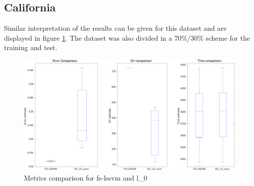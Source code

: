 \documentclass[11pt, a4paper]{article}
\begin{document}
\subsection{California}

Similar interpretation of the results can be given for this dataset
and are displayed in figure \ref{fig:fslssvm_california}. The dataset
was also divided in a 70\%/30\% scheme for the training and test.


\begin{figure}[H]
  \centering
  \includegraphics[scale=.36]{fslssvm_california.pdf}
  \caption{Metrics comparison for fs-lssvm and l\_0}
  \label{fig:fslssvm_california}
\end{figure}
\end{document}
